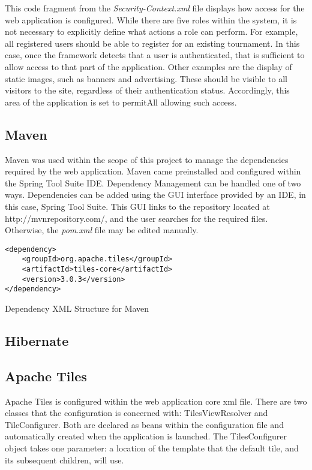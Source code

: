 This code fragment from the \textit{Security-Context.xml} file displays how access for the web application is configured. While there are five roles within the system, it is not necessary to explicitly define what actions a role can perform. For example, all registered users should be able to register for an existing tournament. In this case, once the framework detects that a user is authenticated, that is sufficient to allow access to that part of the application. Other examples are the display of static images, such as banners and advertising. These should be visible to all visitors to the site, regardless of their authentication status. Accordingly, this area of the application is set to permitAll allowing such access.

\subsection{Maven}

Maven was used within the scope of this project to manage the dependencies required by the web application. Maven came preinstalled and configured within the Spring Tool Suite IDE. Dependency Management can be handled one of two ways. Dependencies can be added using the GUI interface provided by an IDE, in this case, Spring Tool Suite. This GUI links to the repository located at http://mvnrepository.com/, and the user searches for the required files. Otherwise, the \textit{pom.xml} file may be edited manually. 

\begin{table}[H]
\begin{lstlisting}
<dependency>
	<groupId>org.apache.tiles</groupId>
	<artifactId>tiles-core</artifactId>
	<version>3.0.3</version>
</dependency>
\end{lstlisting}
\caption{Dependency XML Structure for Maven}
\end{table}

\subsection{Hibernate}

\subsection{Apache Tiles}

Apache Tiles is configured within the web application core xml file. There are two classes that the configuration is concerned with: TilesViewResolver and TileConfigurer. Both are declared as beans within the configuration file and automatically created when the application is launched. The TilesConfigurer object takes one parameter: a location of the template that the default tile, and its subsequent children, will use. \newline

